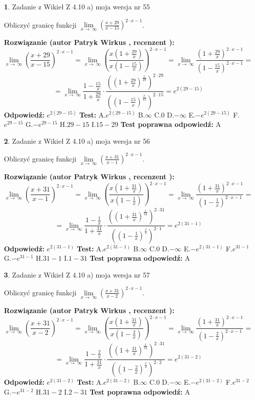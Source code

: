 \documentclass[12pt, a4paper]{article}
\theoremstyle{definition} %
\newtheorem{zad}{}
\newcommand{\zadStart}[1]{\begin{zad}#1\newline}
\newcommand{\zadStop}{\end{zad}}
\newcommand{\rozwStart}[2]{\noindent \textbf{Rozwiązanie (autor #1 , recenzent #2): }\newline}
\newcommand{\rozwStop}{\newline}
\newcommand{\odpStart}{\noindent \textbf{Odpowiedź:}\newline}
\newcommand{\odpStop}{\newline}
\newcommand{\testStart}{\noindent \textbf{Test:}\newline}
\newcommand{\testStop}{\newline}
\newcommand{\kluczStart}{\noindent \textbf{Test poprawna odpowiedź:}\newline}
\newcommand{\kluczStop}{\newline}
\begin{document}
\zadStart{Zadanie z Wikieł Z 4.10 a) moja wersja nr 55}


Obliczyć granicę funkcji  $\lim\limits_{x\to\ \infty}(\frac{x+29}{x-15})^{2\cdot x-1}$.
\zadStop
\rozwStart{Patryk Wirkus}{}
$$\lim\limits_{x\to\ \infty}(\frac{x+29}{x-15})^{2\cdot x-1} = \lim\limits_{x\to\ \infty}(\frac{x(1+\frac{29}{x})}{x(1-\frac{15}{x})})^{2\cdot x-1}=\lim\limits_{x\to\ \infty}\frac{(1+\frac{29}{x})^{2\cdot x-1}}{(1-\frac{15}{x})^{2\cdot x-1}}=$$
$$=\lim\limits_{x\to\ \infty}\frac{1-\frac{15}{x}}{1+\frac{29}{x}}\cdot\frac{((1+\frac{29}{x})^{\frac{x}{29}})^{2\cdot29}}{((1-\frac{15}{x})^{\frac{x}{15}})^{2\cdot15}}=e^{2(29-15)}$$
\rozwStop
\odpStart
$e^{2(29-15)}$
\odpStop
\testStart
A.$e^{2(29-15)}$ B.$\infty$ C.$0$ D.$-\infty$ E.$-e^{2(29-15)}$
F.$e^{29-15}$ G.$-e^{29-15}$
H.$29-15$
I.$15-29$
\testStop
\kluczStart
A
\kluczStop



\zadStart{Zadanie z Wikieł Z 4.10 a) moja wersja nr 56}


Obliczyć granicę funkcji  $\lim\limits_{x\to\ \infty}(\frac{x+31}{x-1})^{2\cdot x-1}$.
\zadStop
\rozwStart{Patryk Wirkus}{}
$$\lim\limits_{x\to\ \infty}(\frac{x+31}{x-1})^{2\cdot x-1} = \lim\limits_{x\to\ \infty}(\frac{x(1+\frac{31}{x})}{x(1-\frac{1}{x})})^{2\cdot x-1}=\lim\limits_{x\to\ \infty}\frac{(1+\frac{31}{x})^{2\cdot x-1}}{(1-\frac{1}{x})^{2\cdot x-1}}=$$
$$=\lim\limits_{x\to\ \infty}\frac{1-\frac{1}{x}}{1+\frac{31}{x}}\cdot\frac{((1+\frac{31}{x})^{\frac{x}{31}})^{2\cdot31}}{((1-\frac{1}{x})^{\frac{x}{1}})^{2\cdot1}}=e^{2(31-1)}$$
\rozwStop
\odpStart
$e^{2(31-1)}$
\odpStop
\testStart
A.$e^{2(31-1)}$ B.$\infty$ C.$0$ D.$-\infty$ E.$-e^{2(31-1)}$
F.$e^{31-1}$ G.$-e^{31-1}$
H.$31-1$
I.$1-31$
\testStop
\kluczStart
A
\kluczStop



\zadStart{Zadanie z Wikieł Z 4.10 a) moja wersja nr 57}


Obliczyć granicę funkcji  $\lim\limits_{x\to\ \infty}(\frac{x+31}{x-2})^{2\cdot x-1}$.
\zadStop
\rozwStart{Patryk Wirkus}{}
$$\lim\limits_{x\to\ \infty}(\frac{x+31}{x-2})^{2\cdot x-1} = \lim\limits_{x\to\ \infty}(\frac{x(1+\frac{31}{x})}{x(1-\frac{2}{x})})^{2\cdot x-1}=\lim\limits_{x\to\ \infty}\frac{(1+\frac{31}{x})^{2\cdot x-1}}{(1-\frac{2}{x})^{2\cdot x-1}}=$$
$$=\lim\limits_{x\to\ \infty}\frac{1-\frac{2}{x}}{1+\frac{31}{x}}\cdot\frac{((1+\frac{31}{x})^{\frac{x}{31}})^{2\cdot31}}{((1-\frac{2}{x})^{\frac{x}{2}})^{2\cdot2}}=e^{2(31-2)}$$
\rozwStop
\odpStart
$e^{2(31-2)}$
\odpStop
\testStart
A.$e^{2(31-2)}$ B.$\infty$ C.$0$ D.$-\infty$ E.$-e^{2(31-2)}$
F.$e^{31-2}$ G.$-e^{31-2}$
H.$31-2$
I.$2-31$
\testStop
\kluczStart
A
\kluczStop
\end{document}
